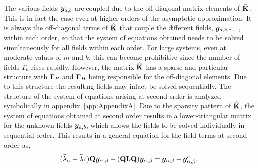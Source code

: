 The various fields $\boldsymbol{y}_{a,b}$ are coupled due to the off-diagonal matrix elements of $\mathbf{\widehat{K}}$. This is in fact the case even at higher orders of the asymptotic approximation. It is always the off-diagonal terms of $\mathbf{\widehat{K}}$ that couple the different fields, $\boldsymbol{y}_{a,b,c,\ldots}$, within each order, so that the system of equations obtained needs to be solved simultaneously for all fields within each order. For large systems, even at moderate values of $m$ and $k$, this can become prohibitive since the number of fields $T_{k}$ rises rapidly. However, the matrix $\mathbf{\widehat{K}}$ has a sparse and particular structure with $\mathbf{\Gamma}_{P}$ and $\mathbf{\Gamma}_{H}$ being responsible for the off-diagonal elements. Due to this structure the resulting fields may infact be solved sequentially. The structure of the system of equations arising at second order is analyzed symbolically in appendix~\ref{app:AppendixA}. Due to the sparsity pattern of $\mathbf{\widehat{K}}$, the system of equations obtained at second order results in a lower-triangular matrix for the unknown fields $\boldsymbol{y}_{a,b}$, which allows the fields to be solved individually in sequential order. This results in a general equation for the field terms at second order as,
\begin{align}
	(\widehat{\lambda}_{\alpha} + \widehat{\lambda}_{\beta})\mathbf{Q}\boldsymbol{y}_{\alpha,\beta} 
	- (\mathbf{Q}\mathbf{L}\mathbf{Q})\boldsymbol{y}_{\alpha,\beta} = \boldsymbol{g}_{\alpha,\beta} - \boldsymbol{g}^{c}_{\alpha,\beta}, \nonumber
\end{align}
